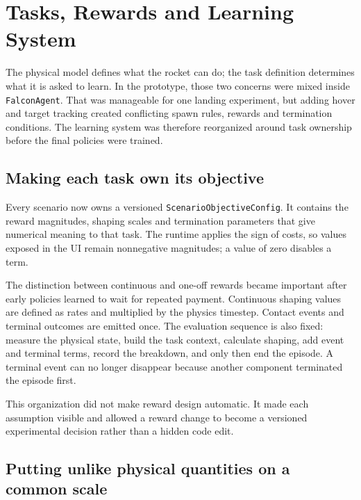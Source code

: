 \chapter{Tasks, Rewards and Learning System}
\label{ch:learning}

The physical model defines what the rocket can do; the task definition determines what it is
asked to learn. In the prototype, those two concerns were mixed inside \texttt{FalconAgent}.
That was manageable for one landing experiment, but adding hover and target tracking created
conflicting spawn rules, rewards and termination conditions. The learning system was therefore
reorganized around task ownership before the final policies were trained.

\section{Making each task own its objective}

Every scenario now owns a versioned \texttt{ScenarioObjectiveConfig}. It contains the reward
magnitudes, shaping scales and termination parameters that give numerical meaning to that task.
The runtime applies the sign of costs, so values exposed in the UI remain nonnegative magnitudes;
a value of zero disables a term.

The distinction between continuous and one-off rewards became important after early policies
learned to wait for repeated payment. Continuous shaping values are defined as rates and
multiplied by the physics timestep. Contact events and terminal outcomes are emitted once. The
evaluation sequence is also fixed: measure the physical state, build the task context, calculate
shaping, add event and terminal terms, record the breakdown, and only then end the episode. A
terminal event can no longer disappear because another component terminated the episode first.

This organization did not make reward design automatic. It made each assumption visible and
allowed a reward change to become a versioned experimental decision rather than a hidden code
edit.

\section{Putting unlike physical quantities on a common scale}

